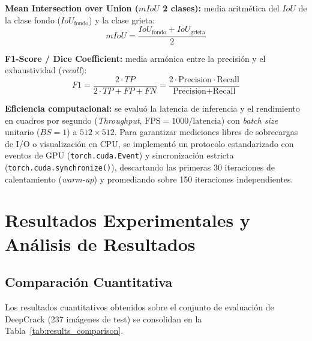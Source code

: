 \documentclass[conference]{IEEEtran}
\begin{document}
\textbf{Mean Intersection over Union ($mIoU$ 2 clases):} media aritmética del $IoU$ de la clase fondo ($IoU_{\text{fondo}}$) y la clase grieta:
\begin{equation}
mIoU = \frac{IoU_{\text{fondo}} + IoU_{\text{grieta}}}{2}
\label{eq:miou}
\end{equation}

\textbf{F1-Score / Dice Coefficient:} media armónica entre la precisión y el exhaustividad (\textit{recall}):
\begin{equation}
F1 = \frac{2 \cdot TP}{2 \cdot TP + FP + FN} = \frac{2 \cdot \text{Precision} \cdot \text{Recall}}{\text{Precision} + \text{Recall}}
\label{eq:f1}
\end{equation}

\textbf{Eficiencia computacional:} se evaluó la latencia de inferencia y el rendimiento en cuadros por segundo (\textit{Throughput}, $\text{FPS} = 1000 / \text{latencia}$) con \textit{batch size} unitario ($BS = 1$) a $512\times 512$. Para garantizar mediciones libres de sobrecargas de I/O o visualización en CPU, se implementó un protocolo estandarizado con eventos de GPU (\texttt{torch.cuda.Event}) y sincronización estricta (\texttt{torch.cuda.synchronize()}), descartando las primeras 30 iteraciones de calentamiento (\textit{warm-up}) y promediando sobre 150 iteraciones independientes.

\section{Resultados Experimentales y Análisis de Resultados}

\subsection{Comparación Cuantitativa}
Los resultados cuantitativos obtenidos sobre el conjunto de evaluación de DeepCrack (237 imágenes de test) se consolidan en la Tabla~\ref{tab:results_comparison}.
\end{document}
